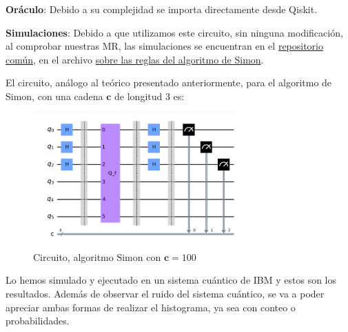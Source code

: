  \vspace{14pt}

 \textbf{Oráculo}: Debido a su complejidad se importa directamente desde Qiskit.\newline

 \textbf{Simulaciones}: Debido a que utilizamos este circuito, sin ninguna modificación, al comprobar nuestras MR, las simulaciones se encuentran en el \href{https://github.com/rodelanu/TFG/tree/main}{repositorio común}, en el archivo \href{https://github.com/rodelanu/TFG/blob/main/3_Simon_Rules.ipynb}{sobre las reglas del algoritmo de Simon}.

 \vspace{10pt}

 El circuito, análogo al teórico presentado anteriormente, para el algoritmo de Simon, con una cadena $\mathbf{c}$ de longitud 3 es:

 
 \begin{figure}[H]
    \centering
    \includegraphics[width=0.7\textwidth]{TFG/imagenes/simon1.png}
    \caption{Circuito, algoritmo Simon con $\mathbf{c}=100$}
    \label{Fig:CircuitoSimon1}
 \end{figure}

 Lo hemos simulado y ejecutado en un sistema cuántico de IBM y estos son los resultados. Además de observar el ruido del sistema cuántico, se va a poder apreciar ambas formas de realizar el histograma, ya sea con conteo o probabilidades.

